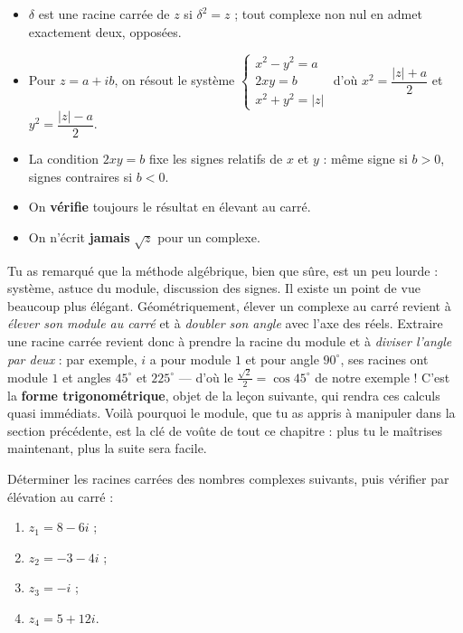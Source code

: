 \documentclass[11pt]{article}
\newcommand{\cle}[1]{{\popxbold\color{popdark}#1}}
\begin{document}
\begin{aretenir}
\begin{itemize}
\item $\delta$ est une \cle{racine carrée} de $z$ si $\delta^2 = z$ ; tout complexe non nul en admet exactement deux, opposées.
\item Pour $z = a + ib$, on résout le système $\begin{cases} x^2 - y^2 = a \\ 2xy = b \\ x^2 + y^2 = |z| \end{cases}$ d'où $x^2 = \dfrac{|z|+a}{2}$ et $y^2 = \dfrac{|z|-a}{2}$.
\item La condition $2xy = b$ fixe les signes relatifs de $x$ et $y$ : même signe si $b > 0$, signes contraires si $b < 0$.
\item On \textbf{vérifie} toujours le résultat en élevant au carré.
\item On n'écrit \textbf{jamais} $\sqrt{z}$ pour un complexe.
\end{itemize}
\end{aretenir}

\begin{savaistu}
Tu as remarqué que la méthode algébrique, bien que sûre, est un peu lourde : système, astuce du module, discussion des signes. Il existe un point de vue beaucoup plus élégant. Géométriquement, élever un complexe au carré revient à \emph{élever son module au carré} et à \emph{doubler son angle} avec l'axe des réels. Extraire une racine carrée revient donc à prendre la racine du module et à \emph{diviser l'angle par deux} : par exemple, $i$ a pour module $1$ et pour angle $90^{\circ}$, ses racines ont module $1$ et angles $45^{\circ}$ et $225^{\circ}$ --- d'où le $\frac{\sqrt{2}}{2} = \cos 45^{\circ}$ de notre exemple ! C'est la \textbf{forme trigonométrique}, objet de la leçon suivante, qui rendra ces calculs quasi immédiats. Voilà pourquoi le module, que tu as appris à manipuler dans la section précédente, est la clé de voûte de tout ce chapitre : plus tu le maîtrises maintenant, plus la suite sera facile.
\end{savaistu}

\begin{exercice}
Déterminer les racines carrées des nombres complexes suivants, puis vérifier par élévation au carré :
\begin{enumerate}
\item $z_1 = 8 - 6i$ ;
\item $z_2 = -3 - 4i$ ;
\item $z_3 = -i$ ;
\item $z_4 = 5 + 12i$.
\end{enumerate}
\end{exercice}
\end{document}
